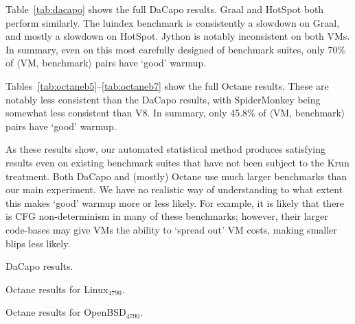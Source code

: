 \documentclass[acmlarge]{acmart}\settopmatter{printfolios=true}
\newcommand{\krun}{Krun\xspace}
\newcommand{\bencherfive}{Linux$_\mathrm{4790}$\xspace}
\newcommand{\benchersix}{OpenBSD$_\mathrm{4790}$\xspace}
\newcommand{\vmbpair}{$\langle$VM, benchmark$\rangle$\xspace}
\begin{document}
Table~\ref{tab:dacapo} shows the full DaCapo results. Graal and HotSpot both
perform similarly. The luindex benchmark is consistently a slowdown on Graal,
and mostly a slowdown on HotSpot. Jython is notably inconsistent on both VMs. In
summary, even on this most carefully designed of benchmark suites, only 70\%
of \vmbpair pairs have `good' warmup.

Tables~\ref{tab:octaneb5}--\ref{tab:octaneb7} show the full Octane results. These are notably less
consistent than the DaCapo results, with SpiderMonkey being somewhat less
consistent than V8. In summary, only 45.8\% of \vmbpair pairs have `good'
warmup.

As these results show, our automated statistical method produces satisfying
results even on existing benchmark suites that have not been subject to the
\krun treatment. Both DaCapo and (mostly) Octane use much larger benchmarks than
our main experiment. We have no realistic way of understanding to what extent
this makes `good' warmup more or less likely. For example, it is likely that
there is CFG non-determinism in many of these benchmarks; however, their larger
code-bases may give VMs the ability to `spread out' VM costs, making smaller
blips less likely.


\begin{table}[htp]
\centering

\caption{DaCapo results.}
\label{tab:dacapo}
\end{table}


\begin{landscape}
\begin{table}[htp]
\centering
\begin{adjustbox}{scale=.845}

\end{adjustbox}
\caption{Octane results for \bencherfive.}
\label{tab:octaneb5}
\end{table}
\end{landscape}

\begin{landscape}
\begin{table}[htp]
\centering
\begin{adjustbox}{scale=.845}

\end{adjustbox}
\caption{Octane results for \benchersix.}
\label{tab:octaneb6}
\end{table}
\end{landscape}
\end{document}
